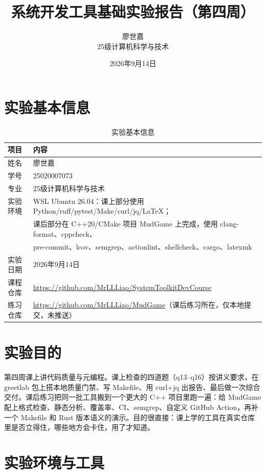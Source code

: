 \documentclass[UTF8]{ctexart}
\title{\textbf{系统开发工具基础实验报告（第四周）}}
\author{廖世嘉 \quad 25020007073 \\ 25级计算机科学与技术}
\date{2026年9月14日}
\begin{document}
\maketitle
\tableofcontents
\newpage

\section{实验基本信息}

\begin{table}[htbp]
\centering
\caption{实验基本信息}
\label{tab:info}
\begin{tabular}{ll}
\toprule
项目 & 内容 \\
\midrule
姓名 & 廖世嘉 \\
学号 & 25020007073 \\
专业 & 25级计算机科学与技术 \\
实验环境 & WSL Ubuntu 26.04：课上部分使用 Python/ruff/pytest/Make/curl/jq/LaTeX；\\
 & 课后部分在 C++20/CMake 项目 MudGame 上完成，使用 clang-format、cppcheck、\\
 & pre-commit、lcov、semgrep、actionlint、shellcheck、cargo、latexmk \\
实验日期 & 2026年9月14日 \\
课程仓库 & \href{https://github.com/MrLLLiao/SystemToolkitDevCourse}{https://github.com/MrLLLiao/SystemToolkitDevCourse} \\
练习仓库 & \href{https://github.com/MrLLLiao/MudGame}{https://github.com/MrLLLiao/MudGame}（课后练习所在，仅本地提交，未推送） \\
\bottomrule
\end{tabular}
\end{table}

\section{实验目的}

第四周课上讲代码质量与元编程。课上检查的四道题（q13--q16）按讲义要求，在 greetlab 包上搭本地质量门禁、写 Makefile、用 curl+jq 出报告、最后做一次综合交付。课后练习把同一批工具搬到一个更大的 C++ 项目里跑一遍：给 MudGame 配上格式检查、静态分析、覆盖率、CI、semgrep、自定义 GitHub Action，再补一个 Makefile 和 Rust 版本语义的演示。目的很直接：课上学的工具在真实仓库里是否立得住，哪些地方会卡住，用了才知道。

\section{实验环境与工具}
\end{document}
